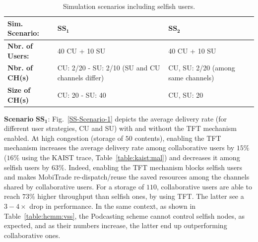 \begin{table}[!h]
\vspace{-0.1in}
\caption{Simulation scenarios including selfish users.}
\centering
\label{table:m-sim-sce}
\footnotesize
\begin{tabular}{|p{3cm}|p{4cm}|p{4cm}|}
\hline
\bfseries Sim. Scenario: & $\mathbf{SS_1}$ & $\mathbf{SS_2}$\\
\hline
\bfseries Nbr. of Users: & 40 CU + 10 SU & 40 CU + 10 SU\\
\hline
\bfseries Nbr. of CH(s) & CU: 2/20 - SU: 2/10 (SU and CU channels differ) & CU, SU: 2/20 (among same channels) \\
\hline
\bfseries Size of CH(s) & CU: 20 - SU: 40  & CU, SU: 20 \\
\hline

\end{tabular}
\end{table}

\noindent \textbf{Scenario} $\mathbf{SS_1}$:  Fig.~\ref{SS-Scenario-1} depicts the average delivery rate (for different user strategies, CU and SU) with and without the TFT mechanism enabled. At high congestion (storage of $50$ contents), enabling the TFT mechanism increases the average delivery rate among collaborative users by $15\%$ ($16\%$ using the KAIST trace, Table~\ref{table:kaist:mal}) and decreases it among selfish users by $63\%$. Indeed, enabling the TFT mechanism blocks selfish users and makes MobiTrade re-dispatch/reuse the saved resources among the channels shared by collaborative users. For a storage of $110$, collaborative users are able to reach  $73\%$ higher throughput than selfish ones, by using TFT. The latter see a $3-4\times$ drop in performance.  In the same context, as shown in Table~\ref{table:hcmm:vss}, the Podcasting scheme cannot control selfish nodes, as expected, and as their numbers increase, the latter end up outperforming collaborative ones. 


